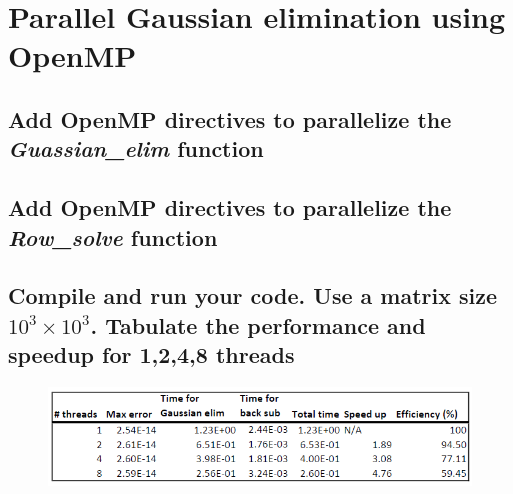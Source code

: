 
\section{Parallel Gaussian elimination using OpenMP}

\subsection{Add OpenMP directives to parallelize the \emph{Guassian\_elim} function}

\vspace{0.5cm}


\subsection{Add OpenMP directives to parallelize the \emph{Row\_solve} function}

\vspace{0.5cm}


\subsection{Compile and run your code. Use a matrix size $10^3 \times 10^3$.
Tabulate the performance and speedup for 1,2,4,8 threads}

\begin{figure}[ht]
	\centering
	\includegraphics[width=\textwidth]{graphics/P5_c_table.PNG}
	\label{fig:lab3part3c_i}
\end{figure}

